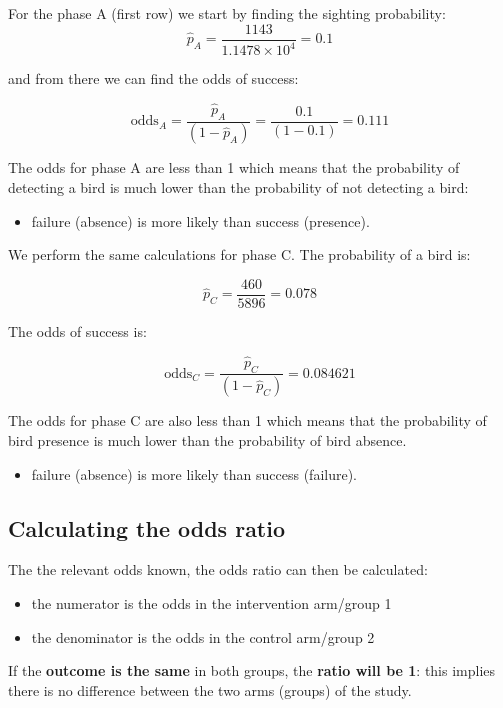 \documentclass[
  oneside]{krantz}
\providecommand{\tightlist}{%
  \setlength{\itemsep}{0pt}\setlength{\parskip}{0pt}}
\begin{document}
For the phase A (first row) we start by finding the sighting probability:\\
\[\hat p_A=\frac{1143}{\ensuremath{1.1478\times 10^{4}}}=0.1\]

and from there we can find the odds of success:

\[\textrm{odds}_A =\frac{\hat p_A}{(1-\hat p_A)}=\frac{0.1}{(1 - 0.1)}= 0.111\]

The odds for phase A are less than 1 which means that the probability of detecting a bird is much lower than the probability of not detecting a bird:

\begin{itemize}
\tightlist
\item
  failure (absence) is more likely than success (presence).
\end{itemize}

We perform the same calculations for phase C. The probability of a bird is:

\[\hat p_C=\frac{460}{5896}=0.078\]

The odds of success is:

\[\textrm{odds}_C = \frac{\hat p_C}{(1-\hat p_C)}= 0.084621\]

The odds for phase C are also less than 1 which means that the probability of bird presence is much lower than the probability of bird absence.

\begin{itemize}
\tightlist
\item
  failure (absence) is more likely than success (failure).
\end{itemize}

\hypertarget{calculating-the-odds-ratio}{%
\subsection{Calculating the odds ratio}\label{calculating-the-odds-ratio}}

The the relevant odds known, the odds ratio can then be calculated:

\begin{itemize}
\item
  the numerator is the odds in the intervention arm/group 1
\item
  the denominator is the odds in the control arm/group 2
\end{itemize}

If the \textbf{outcome is the same} in both groups, the \textbf{ratio will be 1}: this implies there is no difference between the two arms (groups) of the study.
\end{document}

